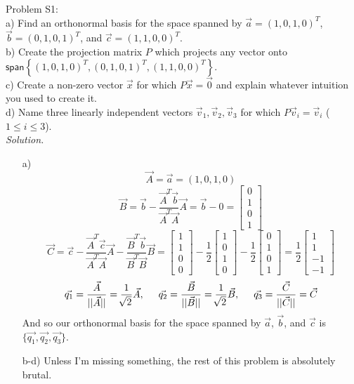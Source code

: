 \documentclass[12pt,pdftex]{article}
\begin{document}
\noindent Problem S1:\\
a) Find an orthonormal basis for the space spanned by $\vec{a}=(1,0,1,0)^T$, $\vec{b}=(0,1,0,1)^T$, and $\vec{c}=(1,1,0,0)^T$.\\
b) Create the projection matrix $P$ which projects any vector onto $\textsf{span}\left\{(1,0,1,0)^T, (0,1,0,1)^T,(1,1,0,0)^T\right\}$.\\
c) Create a non-zero vector $\vec{x}$ for which $P\vec{x} = \vec{0}$ and explain whatever intuition you used to create it.\\
d) Name three linearly independent vectors $\vec{v}_1, \vec{v}_2, \vec{v}_3$ for which $P\vec{v}_i = \vec{v}_i$ ($1 \leq i \leq 3$).\\
\textit{Solution.}
\begin{itemize}
\item[a)] 
\[\vec{A}=\vec{a}=(1,0,1,0)\] 
\[\vec{B}=\vec{b}-\frac{\vec{A}^T\vec{b}}{\vec{A}^T\vec{A}}\vec{A}=\vec{b}-0=\begin{bmatrix}0\\1\\0\\1\end{bmatrix}\]
\[\vec{C}=\vec{c}-\frac{\vec{A}^T\vec{c}}{\vec{A}^T\vec{A}}\vec{A}-\frac{\vec{B}^T\vec{b}}{\vec{B}^T\vec{B}}\vec{B}
=\left[\begin{array}{ccc}1\\1\\0\\0\end{array}\right]-\frac{1}{2}\left[\begin{array}{ccc}1\\0\\1\\0\end{array}\right]-\frac{1}{2}\left[\begin{array}{ccc}0\\1\\0\\1\end{array}\right]=\frac{1}{2}\left[\begin{array}{r}1\\1\\-1\\-1\end{array}\right]\]
\[\vec{q_1}=\frac{\vec{A}}{||\vec{A}||}=\frac{1}{\sqrt[]{2}}\vec{A}, \hspace{5mm} \vec{q_2}=\frac{\vec{B}}{||\vec{B}||}=\frac{1}{\sqrt[]{2}}\vec{B},\hspace{5mm}\vec{q_3}=\frac{\vec{C}}{||\vec{C}||}=\vec{C}\]
And so our orthonormal basis for the space spanned by $\vec{a}$, $\vec{b}$, and $\vec{c}$ is $\{\vec{q_1},\vec{q_2},\vec{q_3}\}$.
\item[b-d)]Unless I'm missing something, the rest of this problem is absolutely brutal.
\end{itemize}
\end{document}
